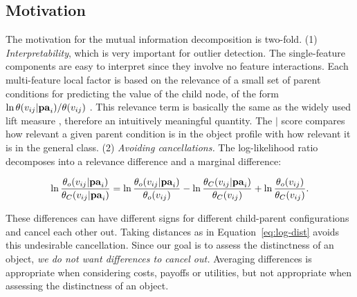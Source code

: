 \documentclass[conference]{IEEEtran}
\begin{document}

\subsection{Motivation} 
%
The motivation for the mutual information decomposition is two-fold. (1) {\em Interpretability}, which is very important for outlier detection. The single-feature components are easy to interpret since they involve no feature interactions. Each multi-feature local factor is based on the relevance of a small set of parent conditions for predicting the value of the child node, of the form $\ln \theta(v_{ij}|\mathbf{pa}_{i})/\theta(v_{ij})$ . This relevance term  is basically the same as the widely used lift measure \cite{Tuffery2011}, therefore an intuitively meaningful quantity. The $\mid$ score compares how relevant a given parent condition is in the object profile with how relevant it is in the general class. (2) {\em Avoiding cancellations.} The log-likelihood ratio decomposes into a relevance difference and a marginal difference: 

\begin{equation} \label{eq:decompose}
\ln \frac{\parameter_{\object}( \nodevalue_{ij}|\parents_{i})}{\parameter_{\Class}( \nodevalue_{ij}|\parents_{i})} = \ln \frac{\parameter_{\object}(\nodevalue_{ij}|\parents_{i})}{\parameter_{\object}(\nodevalue_{ij})} - \ln \frac{\parameter_{\Class}( \nodevalue_{ij}|\parents_{i})}{\parameter_{\Class}(\nodevalue_{ij})} + \ln \frac{\parameter_{\object}( \nodevalue_{ij})}{\parameter_{\Class}( \nodevalue_{ij})}.
\end{equation}

These differences can have different signs for different child-parent configurations and cancel each other out. Taking distances as in Equation~\ref{eq:log-dist} avoids this undesirable cancellation. Since our goal is to assess the distinctness of an object, {\em we do not want differences to cancel out.} Averaging differences is appropriate when considering costs, payoffs or utilities, but not appropriate when assessing the distinctness of an object. 
\end{document}
